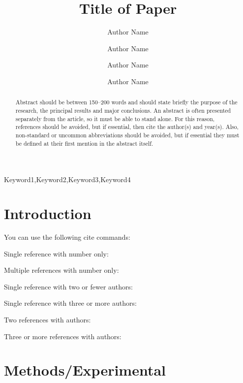 \documentclass[12pt]{ussci}
\title{ Title of Paper }
\author[1]{Author Name}
\author[1]{Author Name}
\author[2]{Author Name}
\author[2,*]{Author Name}
\affil[1]{Department, Institution, Address, Country}
\affil[2]{Department, Institution, Address, Country}
\affil[*]{Corresponding author: \email{author@university.edu}}
\begin{document}
\maketitle

\begin{abstract} %
Abstract should be between 150--200 words and should state briefly the purpose
of the research, the principal results and major conclusions. An abstract is
often presented separately from the article, so it must be able to stand alone.
For this reason, references should be avoided, but if essential, then cite the
author(s) and year(s). Also, non-standard or uncommon abbreviations should be
avoided, but if essential they must be defined at their first mention in the
abstract itself.
\end{abstract}

\begin{keyword}
    Keyword1\sep Keyword2\sep Keyword3\sep Keyword4
\end{keyword}

\section{Introduction}

You can use the following cite commands:

Single reference with number only: \cite{Zhao2013}

Multiple references with number only: \cite{Affleck1967,Turanyi2014,cantera}

Single reference with two or fewer authors: \textcite{Affleck1967}

Single reference with three or more authors: \textcite{Wang2011}

Two references with authors: \textcite{Kee1996,Baumgardner2013}

Three or more references with authors: \textcite{Kee1996,Baumgardner2013,Haworth2011}

\section{Methods/Experimental}
%
\blindtext
\end{document}
